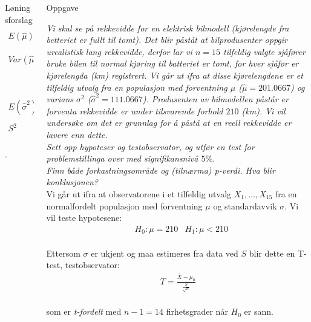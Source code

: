\documentclass[final,hyperref={pdfpagelabels=false}]{beamer}
\newcommand{\oppgave}[2]
{\center\normalsize Oppgave\\
	{\footnotesize\raggedright \textit{#1}\\#2\\}}
\newcommand{\maths}[1]{\vspace{-3mm}\begin{align*}#1\end{align*}\\\vspace{-3mm}}
\begin{document}
\begin{frame}{}
\begin{columns}[t]
\begin{column}{.33\linewidth}
\begin{block}{Løningsforslag}
				{\maths{E(\hat\mu)&=E\left(\frac{\sum_{i=1}^nl_iY_i}{\sum_{i=1}^nl_i}\right)=\frac{\sum_{i=1}^nl_iE(Y_i)}{\sum_{i=1}^nl_i}=\frac{\sum_{i=1}^nl_i\mu}{\sum_{i=1}^nl_i}=\mu\frac{\sum_{i=1}^nl_i}{\sum_{i=1}^nl_i}=\mu\\
						Var(\hat\mu)&=Var\left(\frac{\sum_{i=1}^nl_iY_i}{\sum_{i=1}^nl_i}\right)=\frac{\sum_{i=1}^nl_i^2Var(Y_i)}{\left(\sum_{i=1}^nl_i\right)^2}=\frac{\sum_{i=1}^nl_i^2\frac{\sigma^2}{l_i}}{\left(\sum_{i=1}^nl_i\right)^2}\\
						&=\frac{\sigma^2\sum_{i=1}^nl_i}{\left(\sum_{i=1}^nl_i\right)^2}=\frac{\sigma^2}{\sum_{i=1}^nl_i}\\
						E(\hat\sigma^2)&=E\left(\frac{n\sigma^2\hat\sigma^2}{n\sigma^2}\right)=\frac{\sigma^2}{n}E\left(\frac{n\hat\sigma^2}{\sigma^2}\right)=\sigma^2\frac{n-1}{n}\\
						S^2&=\frac{\sum_{i=1}^nl_i(Y_i-\hat\mu)^2}{n-1}}.}
			\end{block}
		\end{column}
		\begin{column}{.33\linewidth}
			\begin{block}{}
				\oppgave{Vi skal se på rekkevidde for en elektrisk bilmodell (kjørelengde fra betteriet er fullt til tomt).
					Det blir påståt at bilprodusenter oppgir urealistisk lang rekkevidde, derfor lar vi $n=15$ tilfeldig valgte sjåfører bruke bilen til normal kjøring til batteriet er tomt, for hver sjåfør er kjørelengda (km) registrert.
					Vi går ut ifra at disse kjørelengdene er et tilfeldig utvalg fra en populasjon med forventning $\mu$ ($\hat \mu=201.0667$) og varians $\sigma^2$ ($\hat \sigma^2 = 111.0667$).
					Produsenten av bilmodellen påstår er forventa rekkevidde er under tilsvarende forhold $210$ (km).
					Vi vil undersøke om det er grunnlag for å påstå at en reell rekkevidde er lavere enn dette.\\
					Sett opp hypoteser og testobservator, og utfør en test for problemstillinga over med signifikansnivå $5\%$.\\
					Finn både forkastningsområde og (tilnærma) p-verdi.
					Hva blir konklusjonen?}
				{Vi går ut ifra at observatorene i et tilfeldig utvalg $X_1,\ldots,X_{15}$ fra en normalfordelt populasjon med forventning $\mu$ og standardavvik $\sigma$.
					Vi vil teste hypotesene:
					\maths{&H_0: \mu=210 &H_1:\mu<210}
					Ettersom $\sigma$ er ukjent og maa estimeres fra data ved $S$ blir dette en T-test, testobservator:
					\maths{T=\frac{\overline X - \mu_0}{\frac{S}{\sqrt n}}}
					som er \textit{t-fordelt} med $n-1=14$ firhetsgrader når $H_0$ er sann.
}
\end{block}
\end{column}
\end{columns}
\end{frame}
\end{document}
